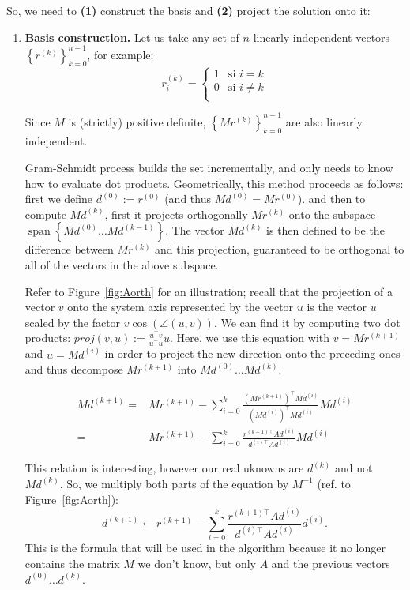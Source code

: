 \documentclass[notitlepage,oneside]{book}
\DeclareMathOperator{\Span}{span}
\begin{document}
So, we need to \textbf{(1)} construct the basis and \textbf{(2)} project the solution onto it:
\begin{enumerate}
\item \textbf{Basis construction.}
Let us take any set of $n$ linearly independent vectors $\left\{r^{(k)}\right\}_{k=0}^{n-1}$, for example: 
$$r^{(k)}_i=\left\{
  \begin{array}{ll}
    1 & \mbox{si } i=k\\
    0 & \mbox{si } i\neq k \\
  \end{array}
  \right.$$

Since $M$ is (strictly) positive definite, $\left\{Mr^{(k)}\right\}_{k=0}^{n-1}$ are also linearly independent.

Gram-Schmidt process builds the set incrementally, and only needs to know how to evaluate dot products.
Geometrically, this method proceeds as follows: first we define $d^{(0)}:=r^{(0)}$ (and thus $Md^{(0)}=Mr^{(0)}$).
and then to compute $Md^{(k)}$, first it projects orthogonally $Mr^{(k)}$ onto the subspace $\Span\left\{Md^{(0)}\dots Md^{(k-1)}\right\}$.
The vector $Md^{(k)}$ is then defined to be the difference between $Mr^{(k)}$ and this projection, guaranteed to be orthogonal to all of the vectors in the above subspace.

Refer to Figure~\ref{fig:Aorth} for an illustration;
recall that the projection of a vector $v$ onto the system axis represented by the vector $u$
is the vector $u$ scaled by the factor $v \cos(\angle(u,v))$.
We can find it by computing two dot products:  $proj(v,u) := \frac{u^\top v}{u^\top u}u$.
Here, we use this equation with $v = Mr^{(k+1)}$ and $u=Md^{(i)}$
in order to project the new direction onto the preceding ones and thus decompose 
$Mr^{(k+1)}$ into $Md^{(0)}\dots Md^{(k)}$.

\begin{align*}
  Md^{(k+1)} =&Mr^{(k+1)} - \sum_{i=0}^k \frac{\left(Mr^{(k+1)}\right)^\top Md^{(i)}}{\left(Md^{(i)}\right)^\top Md^{(i)}} Md^{(i)}\\ 
  =& Mr^{(k+1)} - \sum_{i=0}^k \frac{r^{(k+1)\top}Ad^{(i)}}{d^{(i)\top}Ad^{(i)}} Md^{(i)}
\end{align*}

This relation is interesting, however our real uknowns are $d^{(k)}$ and not $Md^{(k)}$. So, we multiply both parts of the equation by $M^{-1}$ (ref. to Figure~\ref{fig:Aorth}):
\begin{equation}
  \label{eq:naive_gram_update}
  d^{(k+1)} \leftarrow r^{(k+1)} - \sum_{i=0}^k \frac{r^{(k+1)\top}Ad^{(i)}}{d^{(i)\top}Ad^{(i)}} d^{(i)}.
\end{equation}
This is the formula that will be used in the algorithm because it
no longer contains the matrix $M$ we don't know, but only $A$ and the previous vectors $d^{(0)}\dots d^{(k)}$.


\end{enumerate}
\end{document}
